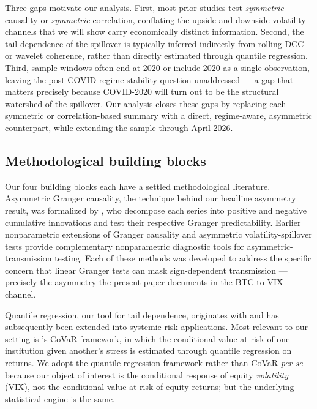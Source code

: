 \documentclass[11pt,a4paper]{article}
\begin{document}
Three gaps motivate our analysis. First, most prior studies test \emph{symmetric} causality or \emph{symmetric} correlation, conflating the upside and downside volatility channels that we will show carry economically distinct information. Second, the tail dependence of the spillover is typically inferred indirectly from rolling DCC or wavelet coherence, rather than directly estimated through quantile regression. Third, sample windows often end at 2020 or include 2020 as a single observation, leaving the post-COVID regime-stability question unaddressed --- a gap that matters precisely because COVID-2020 will turn out to be the structural watershed of the spillover. Our analysis closes these gaps by replacing each symmetric or correlation-based summary with a direct, regime-aware, asymmetric counterpart, while extending the sample through April 2026.

\subsection{Methodological building blocks}

Our four building blocks each have a settled methodological literature. Asymmetric Granger causality, the technique behind our headline asymmetry result, was formalized by \citet{hatemi2012}, who decompose each series into positive and negative cumulative innovations and test their respective Granger predictability. Earlier nonparametric extensions of Granger causality \citep{diks2006} and asymmetric volatility-spillover tests \citep{hong2001} provide complementary nonparametric diagnostic tools for asymmetric-transmission testing. Each of these methods was developed to address the specific concern that linear Granger tests can mask sign-dependent transmission --- precisely the asymmetry the present paper documents in the BTC-to-VIX channel.

Quantile regression, our tool for tail dependence, originates with \citet{koenker1978} and has subsequently been extended into systemic-risk applications. Most relevant to our setting is \citet{adrian2016}'s CoVaR framework, in which the conditional value-at-risk of one institution given another's stress is estimated through quantile regression on returns. We adopt the quantile-regression framework rather than CoVaR \emph{per se} because our object of interest is the conditional response of equity \emph{volatility} (VIX), not the conditional value-at-risk of equity returns; but the underlying statistical engine is the same.
\end{document}
